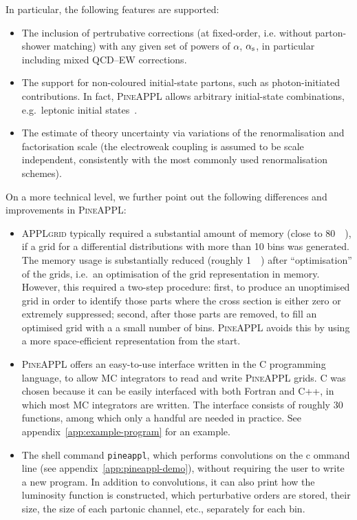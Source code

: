 In particular, the following features are supported:
\begin{itemize}
\item The inclusion of pertrubative corrections (at fixed-order, i.e. without parton-shower matching) with any given set of powers of $\alpha$, $\alpha_\mathrm{s}$, in particular 
    including mixed QCD--EW corrections.
\item The support for non-coloured initial-state partons, such as photon-initiated contributions.
In fact, \textsc{PineAPPL} allows arbitrary initial-state combinations, e.g.\ leptonic initial states~\cite{Bertone:2015lqa,Buonocore:2020nai}.
\item The estimate of theory uncertainty via variations of the renormalisation and factorisation scale (the electroweak coupling is assumed to be scale independent, 
    consistently with the most commonly used renormalisation schemes).
\end{itemize}
On a more technical level, we further point out the following differences and improvements in \textsc{PineAPPL}:
\begin{itemize}
    \item \textsc{APPLgrid} typically required a substantial amount of memory (close to \SI{80}{\giga\byte}), if a grid for a 
        differential distributions with more than 10 bins was generated.
The memory usage is substantially reduced (roughly \SI{1}{\giga\byte}) after \enquote{optimisation} of the grids, i.e.\ an optimisation of the grid representation in memory.
However, this required a two-step procedure: first, to produce an unoptimised grid in order to identify those parts where
the cross section is either zero or extremely suppressed; second, after those parts are removed, to fill
an optimised grid with a a small number of bins.
\textsc{PineAPPL} avoids this by using a more space-efficient representation from the start.
\item \textsc{PineAPPL} offers an easy-to-use interface written in the C programming language, to allow MC integrators to read and write \textsc{PineAPPL} grids.
C was chosen because it can be easily interfaced with both Fortran and C++, in which most MC integrators are written.
The interface consists of roughly 30 functions, among which only a handful are needed in practice.
See appendix~\ref{app:example-program} for an example.
\item The shell command \texttt{pineappl}, which performs convolutions on the c
    ommand line (see appendix~\ref{app:pineappl-demo}), without requiring the user to write a new program.
In addition to convolutions, it can also print how the luminosity function is constructed, which perturbative orders are stored, their size, the size of each partonic channel, etc., separately for each bin.
\end{itemize}

